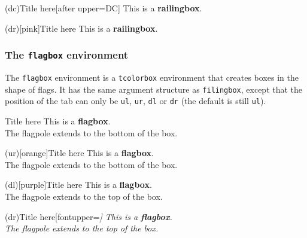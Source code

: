 \begin{verbbox}
\begin{railingbox}(dc){Title here}[after upper=DC]
This is a \textbf{railingbox}.
\end{railingbox}
\end{verbbox}

\begin{verbbox}
\begin{railingbox}(dr)[pink]{Title here}
This is a \textbf{railingbox}.
\end{railingbox}
\end{verbbox}

\subsubsection*{The \texttt{flagbox} environment}

The \texttt{flagbox} environment is a \texttt{tcolorbox} environment that creates boxes in the shape of flags. It has the same argument structure as \texttt{filingbox}, except that the position of the tab can only be \texttt{ul}, \texttt{ur}, \texttt{dl} or \texttt{dr} (the default is still \texttt{ul}).

\begin{verbbox}
\begin{flagbox}{Title here}
This is a \textbf{flagbox}.\\

The flagpole extends to the bottom of the box.
\end{flagbox}
\end{verbbox}
\begin{verbbox}
\begin{flagbox}(ur)[orange]{Title here}
This is a \textbf{flagbox}.\\

The flagpole extends to the bottom of the box.
\end{flagbox}
\end{verbbox}
\begin{verbbox}
\begin{flagbox}(dl)[purple]{Title here}
This is a \textbf{flagbox}.\\

The flagpole extends to the top of the box.
\end{flagbox}
\end{verbbox}
\begin{verbbox}
\begin{flagbox}(dr){Title here}[fontupper=\itshape]
This is a \textbf{flagbox}.\\

The flagpole extends to the top of the box.
\end{flagbox}
\end{verbbox}

